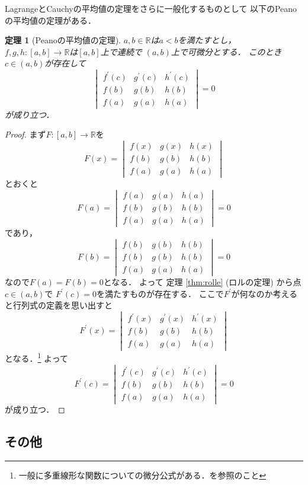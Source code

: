 \documentclass[leqno, a4paper, 12pt]{jsarticle}
\newtheorem{thm}{定理}
\newcommand{\rr}{\mathbb{R}}
\newcommand{\bibun}[1]{#1^{\prime}}
\begin{document}
LagrangeとCauchyの平均値の定理をさらに一般化するものとして
以下のPeanoの平均値の定理がある．
\begin{thm}[Peanoの平均値の定理]
$a, b\in \rr$は$a<b$を満たすとし，
$f, g, h: [a, b]\to \rr$は$[a, b]$上で連続で
$(a, b)$上で可微分とする．
このとき$c\in (a, b)$が存在して
\[
\begin{vmatrix}
\bibun{f}(c) & \bibun{g}(c)& \bibun{h}(c)\\
f(b) & g(b) & h(b)\\
f(a) & g(a) & h(a)
\end{vmatrix}
=0
\]
が成り立つ．
\end{thm}
\begin{proof}
まず$F: [a, b]\to \rr$を
\[
F(x)=
\begin{vmatrix}
f(x) & g(x)& h(x)\\
f(b) & g(b) & h(b)\\
f(a) & g(a) & h(a)
\end{vmatrix}
\]
とおくと
\[
F(a)=
\begin{vmatrix}
f(a) & g(a)& h(a)\\
f(b) & g(b) & h(b)\\
f(a) & g(a) & h(a)
\end{vmatrix}
=0
\]
であり，
\[
F(b)=
\begin{vmatrix}
f(b) & g(b)& h(b)\\
f(b) & g(b) & h(b)\\
f(a) & g(a) & h(a)
\end{vmatrix}
=0
\]
なので$F(a)=F(b)=0$となる．
よって
定理 \ref{thm:rolle} (ロルの定理)
から点$c\in (a, b)$で
$\bibun{F}(c)=0$を満たすものが存在する．
ここで$\bibun{F}$が何なのか考えると行列式の定義を思い出すと
\[
\bibun{F}(x)=
\begin{vmatrix}
\bibun{f}(x) & \bibun{g}(x)& \bibun{h}(x)\\
f(b) & g(b) & h(b)\\
f(a) & g(a) & h(a)
\end{vmatrix}
\]
となる．\footnote{一般に多重線形な関数についての微分公式がある．\cite{Dieu}を参照のこと}
よって
\[
\bibun{F}(c)=
\begin{vmatrix}
\bibun{f}(c) & \bibun{g}(c)& \bibun{h}(c)\\
f(b) & g(b) & h(b)\\
f(a) & g(a) & h(a)
\end{vmatrix}
=0
\]
が成り立つ．
\end{proof}


\subsection{その他}
\end{document}
